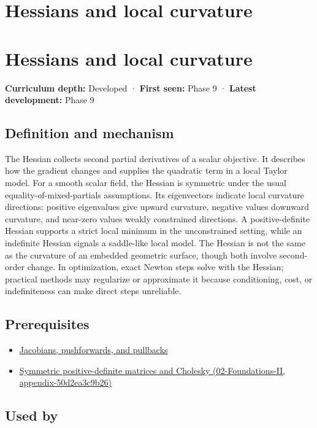 \hypertarget{appendix-6ac071f8b50c}{}
\section*{Hessians and local curvature}
\section{Hessians and local curvature}\label{hessians-and-local-curvature}

\textbf{Curriculum depth:} Developed · \textbf{First seen:} Phase 9 · \textbf{Latest development:} Phase 9

\subsection{Definition and mechanism}\label{definition-and-mechanism}

The Hessian collects second partial derivatives of a scalar objective. It describes how the gradient changes and supplies the quadratic term in a local Taylor model. For a smooth scalar field, the Hessian is symmetric under the usual equality-of-mixed-partials assumptions. Its eigenvectors indicate local curvature directions: positive eigenvalues give upward curvature, negative values downward curvature, and near-zero values weakly constrained directions. A positive-definite Hessian supports a strict local minimum in the unconstrained setting, while an indefinite Hessian signals a saddle-like local model. The Hessian is not the same as the curvature of an embedded geometric surface, though both involve second-order change. In optimization, exact Newton steps solve with the Hessian; practical methods may regularize or approximate it because conditioning, cost, or indefiniteness can make direct steps unreliable.

\subsection{Prerequisites}\label{prerequisites}

\begin{itemize}
\tightlist
\item
  \hyperref[appendix-d8a7ddb675eb]{Jacobians, pushforwards, and pullbacks}
\item
  \href{}{Symmetric positive-definite matrices and Cholesky (02-Foundations-II, appendix-50d2ea3c9b26)}
\end{itemize}

\subsection{Used by}\label{used-by}

